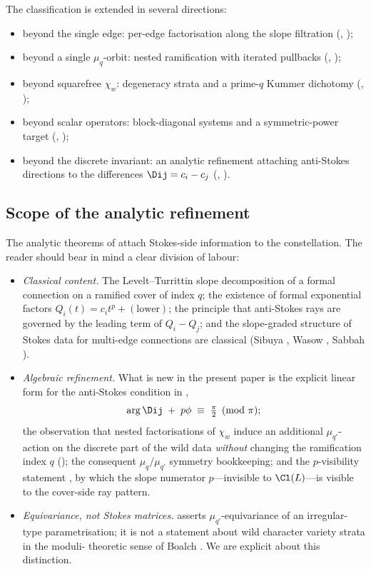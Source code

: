 The classification is extended in several directions:
\begin{itemize}[leftmargin=*]
\item beyond the single edge: per-edge factorisation along the slope
      filtration (, );
\item beyond a single $\mu_q$-orbit: nested ramification with iterated
      pullbacks (, );
\item beyond squarefree $\chi_w$: degeneracy strata and a prime-$q$
      Kummer dichotomy (, );
\item beyond scalar operators: block-diagonal systems and a
      symmetric-power target (, );
\item beyond the discrete invariant: an analytic refinement attaching
      anti-Stokes directions to the differences $\Dij = c_i - c_j$
      (, ).
\end{itemize}

\subsection{Scope of the analytic refinement}
\label{ssec:intro-analytic-scope}

The analytic theorems of  attach Stokes-side
information to the constellation. The reader should bear in mind a
clear division of labour:
\begin{itemize}[leftmargin=2em]
\item \emph{Classical content.} The Levelt--Turrittin slope
decomposition of a formal connection on a ramified cover of index $q$;
the existence of formal exponential factors $Q_i(t) = c_i t^p +
(\text{lower})$; the principle that anti-Stokes rays are governed by
the leading term of $Q_i - Q_j$; and the slope-graded structure of
Stokes data for multi-edge connections are classical
(Sibuya \cite{sibuya}, Wasow \cite{wasow}, Sabbah
\cite{sabbah-polarizable}).
\item \emph{Algebraic refinement.} What is new in the present paper
is the explicit linear form for the anti-Stokes condition in
,
\[
   \arg \Dij \;+\; p\phi \;\equiv\; \tfrac{\pi}{2} \pmod \pi;
\]
the observation that nested factorisations of $\chi_w$ induce an
additional $\mu_{q'}$-action on the discrete part of the wild data
\emph{without} changing the ramification index $q$ ();
the consequent $\mu_q/\mu_{q'}$ symmetry bookkeeping; and the
$p$-visibility statement , by which the slope numerator
$p$---invisible to $\Cl(L)$---is visible to the cover-side ray pattern.
\item \emph{Equivariance, not Stokes matrices.}  asserts
$\mu_{q'}$-equivariance of an irregular-type parametrisation; it is
not a statement about wild character variety strata in the moduli-
theoretic sense of Boalch \cite{boalch-stokes,boalch-wildhodge}.
We are explicit about this distinction.
\end{itemize}

